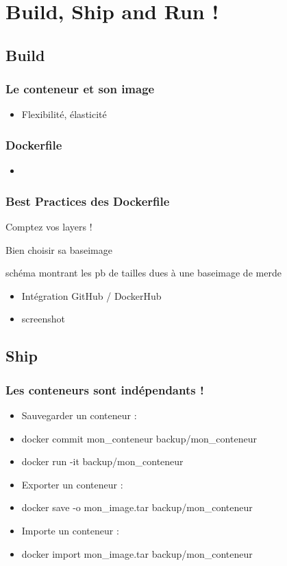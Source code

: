 \section[Docker]{Build, Ship and Run !}

\subsection[Docker]{Build}

  \begin{frame}
    \frametitle{Le conteneur et son image}
    \begin{itemize}
      \item Flexibilité, élasticité
    \end{itemize}
  \end{frame}

  \begin{frame}
    \frametitle{Dockerfile}
    \begin{itemize}
      \item
    \end{itemize}
  \end{frame}

  \begin{frame}
    \frametitle{Best Practices des Dockerfile}
      \item Comptez vos layers !
      \item Bien choisir sa baseimage
      \item schéma montrant les pb de tailles dues à une baseimage de merde
  \end{frame}

  \begin{frame}
    \begin{itemize}
      \item Intégration GitHub / DockerHub
      \item screenshot
    \end{itemize}
  \end{frame}

\subsection[Docker]{Ship}

  \begin{frame}
    \frametitle{Les conteneurs sont indépendants !}
    \begin{itemize}
      \item Sauvegarder un conteneur :
      \item docker commit mon_conteneur backup/mon_conteneur
      \item docker run -it backup/mon_conteneur
      \item Exporter un conteneur :
      \item docker save -o mon_image.tar backup/mon_conteneur
      \item Importe un conteneur :
      \item docker import mon_image.tar backup/mon_conteneur
    \end{itemize}
  \end{frame}

